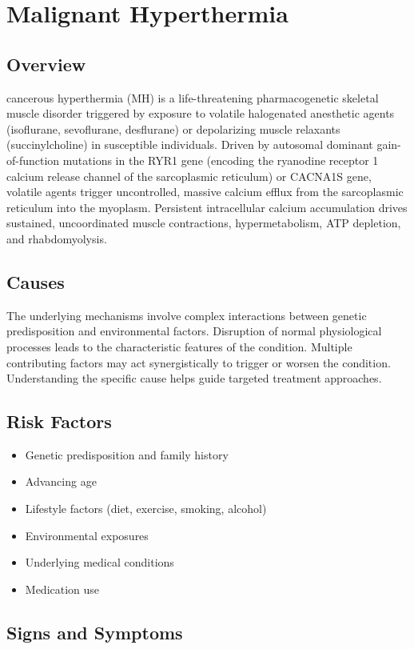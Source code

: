 \chapter{Malignant Hyperthermia}
\label{sec:Malignant Hyperthermia}

\section{Overview}
cancerous hyperthermia (MH) is a life-threatening pharmacogenetic skeletal muscle disorder triggered by exposure to volatile halogenated anesthetic agents (isoflurane, sevoflurane, desflurane) or depolarizing muscle relaxants (succinylcholine) in susceptible individuals. Driven by autosomal dominant gain-of-function mutations in the RYR1 gene (encoding the ryanodine receptor 1 calcium release channel of the sarcoplasmic reticulum) or CACNA1S gene, volatile agents trigger uncontrolled, massive calcium efflux from the sarcoplasmic reticulum into the myoplasm. Persistent intracellular calcium accumulation drives sustained, uncoordinated muscle contractions, hypermetabolism, ATP depletion, and rhabdomyolysis.
\section{Causes}
The underlying mechanisms involve complex interactions between genetic predisposition and environmental factors. Disruption of normal physiological processes leads to the characteristic features of the condition. Multiple contributing factors may act synergistically to trigger or worsen the condition. Understanding the specific cause helps guide targeted treatment approaches.
\section{Risk Factors}


\begin{itemize}[noitemsep]
  \item Genetic predisposition and family history
  \item Advancing age
  \item Lifestyle factors (diet, exercise, smoking, alcohol)
  \item Environmental exposures
  \item Underlying medical conditions
  \item Medication use
\end{itemize}
\section{Signs and Symptoms}

